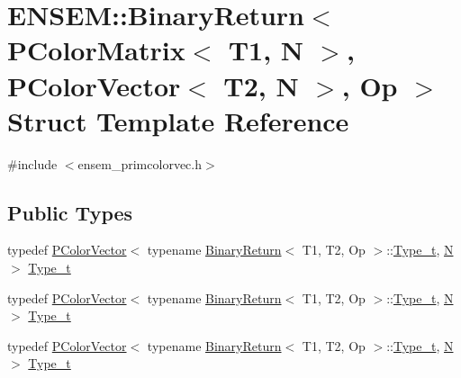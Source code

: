 \hypertarget{structENSEM_1_1BinaryReturn_3_01PColorMatrix_3_01T1_00_01N_01_4_00_01PColorVector_3_01T2_00_01N_01_4_00_01Op_01_4}{}\section{E\+N\+S\+EM\+:\+:Binary\+Return$<$ P\+Color\+Matrix$<$ T1, N $>$, P\+Color\+Vector$<$ T2, N $>$, Op $>$ Struct Template Reference}
\label{structENSEM_1_1BinaryReturn_3_01PColorMatrix_3_01T1_00_01N_01_4_00_01PColorVector_3_01T2_00_01N_01_4_00_01Op_01_4}


{\ttfamily \#include $<$ensem\+\_\+primcolorvec.\+h$>$}

\subsection*{Public Types}
\begin{DoxyCompactItemize}
\item 
typedef \mbox{\hyperlink{classENSEM_1_1PColorVector}{P\+Color\+Vector}}$<$ typename \mbox{\hyperlink{structENSEM_1_1BinaryReturn}{Binary\+Return}}$<$ T1, T2, Op $>$\+::\mbox{\hyperlink{structENSEM_1_1BinaryReturn_3_01PColorMatrix_3_01T1_00_01N_01_4_00_01PColorVector_3_01T2_00_01N_01_4_00_01Op_01_4_a43baedf767080e4540d1752234039521}{Type\+\_\+t}}, \mbox{\hyperlink{adat__devel_2lib_2hadron_2operator__name__util_8cc_a7722c8ecbb62d99aee7ce68b1752f337}{N}} $>$ \mbox{\hyperlink{structENSEM_1_1BinaryReturn_3_01PColorMatrix_3_01T1_00_01N_01_4_00_01PColorVector_3_01T2_00_01N_01_4_00_01Op_01_4_a43baedf767080e4540d1752234039521}{Type\+\_\+t}}
\item 
typedef \mbox{\hyperlink{classENSEM_1_1PColorVector}{P\+Color\+Vector}}$<$ typename \mbox{\hyperlink{structENSEM_1_1BinaryReturn}{Binary\+Return}}$<$ T1, T2, Op $>$\+::\mbox{\hyperlink{structENSEM_1_1BinaryReturn_3_01PColorMatrix_3_01T1_00_01N_01_4_00_01PColorVector_3_01T2_00_01N_01_4_00_01Op_01_4_a43baedf767080e4540d1752234039521}{Type\+\_\+t}}, \mbox{\hyperlink{adat__devel_2lib_2hadron_2operator__name__util_8cc_a7722c8ecbb62d99aee7ce68b1752f337}{N}} $>$ \mbox{\hyperlink{structENSEM_1_1BinaryReturn_3_01PColorMatrix_3_01T1_00_01N_01_4_00_01PColorVector_3_01T2_00_01N_01_4_00_01Op_01_4_a43baedf767080e4540d1752234039521}{Type\+\_\+t}}
\item 
typedef \mbox{\hyperlink{classENSEM_1_1PColorVector}{P\+Color\+Vector}}$<$ typename \mbox{\hyperlink{structENSEM_1_1BinaryReturn}{Binary\+Return}}$<$ T1, T2, Op $>$\+::\mbox{\hyperlink{structENSEM_1_1BinaryReturn_3_01PColorMatrix_3_01T1_00_01N_01_4_00_01PColorVector_3_01T2_00_01N_01_4_00_01Op_01_4_a43baedf767080e4540d1752234039521}{Type\+\_\+t}}, \mbox{\hyperlink{adat__devel_2lib_2hadron_2operator__name__util_8cc_a7722c8ecbb62d99aee7ce68b1752f337}{N}} $>$ \mbox{\hyperlink{structENSEM_1_1BinaryReturn_3_01PColorMatrix_3_01T1_00_01N_01_4_00_01PColorVector_3_01T2_00_01N_01_4_00_01Op_01_4_a43baedf767080e4540d1752234039521}{Type\+\_\+t}}
\end{DoxyCompactItemize}


